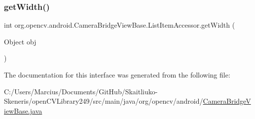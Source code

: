 \mbox{\label{interfaceorg_1_1opencv_1_1android_1_1_camera_bridge_view_base_1_1_list_item_accessor_a8fe2d5930e3392bcf90eb383e09f335b}} 
\subsubsection{\texorpdfstring{get\+Width()}{getWidth()}}
{\footnotesize\ttfamily int org.\+opencv.\+android.\+Camera\+Bridge\+View\+Base.\+List\+Item\+Accessor.\+get\+Width (\begin{DoxyParamCaption}\item[{Object}]{obj }\end{DoxyParamCaption})}



The documentation for this interface was generated from the following file\+:\begin{DoxyCompactItemize}
\item 
C\+:/\+Users/\+Marcius/\+Documents/\+Git\+Hub/\+Skaitliuko-\/\+Skeneris/open\+C\+V\+Library249/src/main/java/org/opencv/android/\mbox{\hyperlink{_camera_bridge_view_base_8java}{Camera\+Bridge\+View\+Base.\+java}}\end{DoxyCompactItemize}
